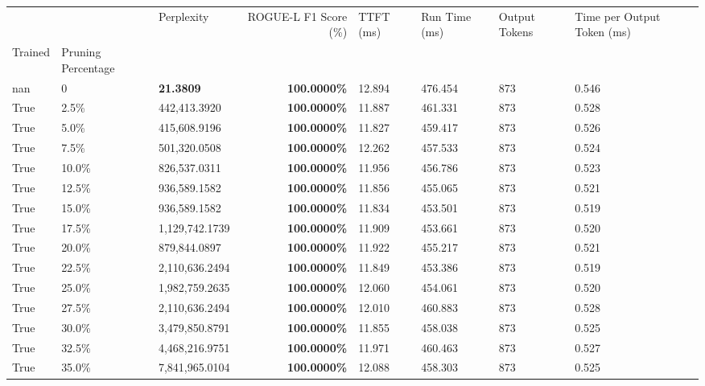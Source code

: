 \begin{table}[H]
{\label{tab:evaluation-pipeline-6-trained}
\begin{tabular}{lllrllll}
\toprule
 &  & Perplexity & ROGUE-L F1 Score (\%) & TTFT (ms) & Run Time (ms) & Output Tokens & Time per Output Token (ms) \\
Trained & Pruning Percentage &  &  &  &  &  &  \\
\midrule
nan & 0 & \bfseries 21.3809 & \bfseries 100.0000\% & 12.894 & 476.454 & 873 & 0.546 \\
\cline{1-8}
True & 2.5\% & 442,413.3920 & \bfseries \color{red} 100.0000\% & 11.887 & 461.331 & 873 & 0.528 \\
\cline{1-8}
True & 5.0\% & 415,608.9196 & \bfseries \color{red} 100.0000\% & 11.827 & 459.417 & 873 & 0.526 \\
\cline{1-8}
True & 7.5\% & 501,320.0508 & \bfseries \color{red} 100.0000\% & 12.262 & 457.533 & 873 & 0.524 \\
\cline{1-8}
True & 10.0\% & 826,537.0311 & \bfseries \color{red} 100.0000\% & 11.956 & 456.786 & 873 & 0.523 \\
\cline{1-8}
True & 12.5\% & 936,589.1582 & \bfseries \color{red} 100.0000\% & 11.856 & 455.065 & 873 & 0.521 \\
\cline{1-8}
True & 15.0\% & 936,589.1582 & \bfseries \color{red} 100.0000\% & 11.834 & 453.501 & 873 & 0.519 \\
\cline{1-8}
True & 17.5\% & 1,129,742.1739 & \bfseries \color{red} 100.0000\% & 11.909 & 453.661 & 873 & 0.520 \\
\cline{1-8}
True & 20.0\% & 879,844.0897 & \bfseries \color{red} 100.0000\% & 11.922 & 455.217 & 873 & 0.521 \\
\cline{1-8}
True & 22.5\% & 2,110,636.2494 & \bfseries \color{red} 100.0000\% & 11.849 & 453.386 & 873 & 0.519 \\
\cline{1-8}
True & 25.0\% & 1,982,759.2635 & \bfseries \color{red} 100.0000\% & 12.060 & 454.061 & 873 & 0.520 \\
\cline{1-8}
True & 27.5\% & 2,110,636.2494 & \bfseries \color{red} 100.0000\% & 12.010 & 460.883 & 873 & 0.528 \\
\cline{1-8}
True & 30.0\% & 3,479,850.8791 & \bfseries \color{red} 100.0000\% & 11.855 & 458.038 & 873 & 0.525 \\
\cline{1-8}
True & 32.5\% & 4,468,216.9751 & \bfseries \color{red} 100.0000\% & 11.971 & 460.463 & 873 & 0.527 \\
\cline{1-8}
True & 35.0\% & 7,841,965.0104 & \bfseries \color{red} 100.0000\% & 12.088 & 458.303 & 873 & 0.525 \\

\end{tabular}}
\end{table}

